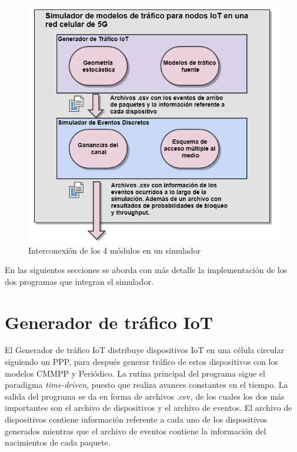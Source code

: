 \begin{figure}[th]
    \centering
    \includegraphics[scale=.74]{Figures/interconexion4modulos.png}
    \decoRule
    \caption[Interconexión de los 4 módulos en un simulador]{Interconexión de los 4 módulos en un simulador}
    \label{fig:interconexion4}
\end{figure}

En las siguientes secciones se aborda con más detalle la implementación de los dos programas que integran el simulador. \newline

\hfill

\break


\section{Generador de tráfico IoT} \label{generadortraficoiot}

    El Generador de tráfico IoT distribuye dispositivos IoT en una célula circular siguiendo un PPP, para después generar tráfico de estos dispositivos con los modelos CMMPP y Periódico. La rutina principal del programa sigue el paradigma \textit{time-driven}, puesto que realiza avances constantes en el tiempo. La salida del programa se da en forma de archivos .csv, de los cuales los dos más importantes son el archivo de dispositivos y el archivo de eventos. El archivo de dispositivos contiene información referente a cada uno de los dispositivos generados mientras que el archivo de eventos contiene la información del nacimientos de cada paquete.\newline

